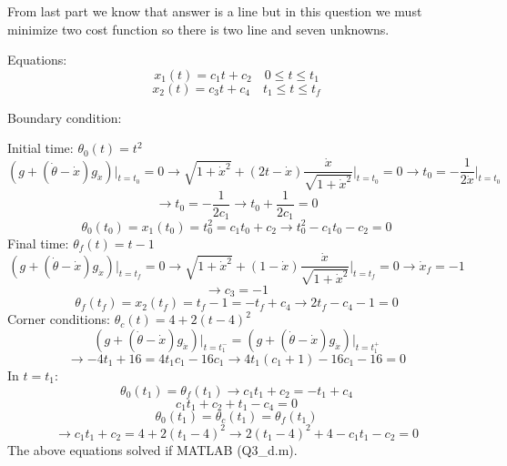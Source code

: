 From last part we know that answer is a line but in this question we must minimize two cost function so there is two line and seven unknowns.

Equations:
$$x_1(t) = c_1t +c_2 \quad 0\leq t \leq t_1$$
$$x_2(t) = c_3t +c_4 \quad t_1 \leq t \leq t_f$$


Boundary condition:



Initial time: 
$\theta_0(t) = t^2 $
$$(g + (\dot{\theta}-\dot{x})g_{\dot{x}}) \vert_{t = t_0}= 0 \to \sqrt{1+\dot{x}^2} + (2t -\dot{x} )\dfrac{\dot{x}}{\sqrt{1+\dot{x}^2}}\vert_{t = t_0} = 0 \to t_0 = -\dfrac{1}{2\dot{x}}\vert_{t = t_0}$$
$$\to t_0 = -\dfrac{1}{2c_1} \to t_0 + \dfrac{1}{2c_1} = 0$$
$$\theta_0(t_0) = x_1(t_0) = t_0^2 = c_1t_0 + c_2 \to t_0^2 - c_1t_0 - c_2 = 0 $$
Final time: 
$\theta_f(t) = t-1 $
$$(g + (\dot{\theta}-\dot{x})g_{\dot{x}})\vert_{t = t_f}  = 0 \to \sqrt{1+\dot{x}^2} + (1-\dot{x}) \dfrac{\dot{x}}{\sqrt{1+\dot{x}^2}}\vert_{t = t_f} = 0 \to \dot{x}_f = -1$$
$$\to c_3 = -1$$
$$\theta_f(t_f) = x_2(t_f) = t_f -1 = -t_f + c_4 \to 2t_f - c_4 -1 = 0 $$
Corner conditions:
$\theta_c(t) = 4 + 2(t-4)^2$
$$(g + (\dot{\theta}-\dot{x})g_{\dot{x}}) \vert_{t = t_1^-} = (g + (\dot{\theta}-\dot{x})g_{\dot{x}}) \vert_{t = t_1^+} $$
$$\to -4t_1 + 16 = 4t_1c_1 -16c_1 \to 4t_1(c_1+1) - 16c_1 -16 = 0$$
In $t = t_1$:
$$\theta_0(t_1) = \theta_f(t_1) \to c_1t_1+c_2 = -t_1 + c_4$$
$$c_1t_1+c_2  +t_1 - c_4 = 0$$
$$\theta_0(t_1) = \theta_c(t_1) = \theta_f(t_1)$$
$$\to c_1t_1 + c_2 = 4 + 2(t_1-4)^2 \to 2(t_1-4)^2 + 4 -c_1t_1 - c_2 = 0$$
The above equations solved if MATLAB (Q3\_d.m).



